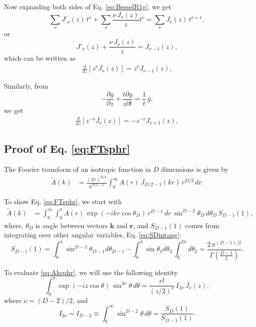 \documentclass[preprint]{revtex4-1}
\numberwithin{equation}{subsection}
\numberwithin{table}{section}
\newcommand{\vct}[1]{\mathbf{#1}}
\providecommand{\vr}{} %
\renewcommand{\vr}{\vct{r}}
\newcommand{\vk}{\vct{k}}
\begin{document}
Now expanding both sides of Eq. \eqref{eq:BesselR1g},
we get
\[
  \sum_\nu J'_\nu(z) \, t^\nu
+
  \sum_\nu \frac{ \nu \, J_\nu(z) } { z } t^\nu
=
  \sum_\nu J_{\nu}(z) \, t^{\nu+1},
\]
or
\[
  J'_\nu(z)
+
  \frac{ \nu \, J_\nu(z) } { z }
=
  J_{\nu - 1}(z),
\]
which can be written as
\begin{align}
  \frac{d}{dz} [z^{\nu} J_\nu(z)] = z^{\nu} J_{\nu-1}(z),
  \label{eq:BesselR1}
\end{align}

Similarly, from
\begin{equation}
-
  \frac { \partial g } { \partial z}
+
  \frac { t \partial g } { z \partial t}
=
  \frac{1}{t} \, g,
  \label{eq:BesselR2g}
\end{equation}
we get
\begin{align}
  \frac{d}{dz} [z^{-\nu} J_\nu(z)] = -z^{-\nu} J_{\nu+1}(z),
  \label{eq:BesselR2}
\end{align}





\subsection{Proof of Eq. \eqref{eq:FTsphr}}

The Fourier transform of an isotropic function in $D$ dimensions
is given by
\begin{align}
  \tilde A(k)
&=
\frac{(2\pi)^{D/2}}{k^{D/2-1}}
\int_0^\infty
A(r) \, J_{D/2-1}(kr) \,
r^{D/2} \, dr.
\tag{A1}
\label{eq:FTsphr}
\end{align}

To show Eq. \eqref{eq:FTsphr}, we start with
%
\begin{align}
  \tilde A(k)
&=
  \int_0^\infty
  \int_0^\pi
  A(r) \, \exp(-ikr \cos \theta_D) \,
    r^{D-1} \, dr \,
    \sin^{D-2} \theta_D \,
    d\theta_D \, S_{D-1}(1),
\label{eq:Aksphr}
\end{align}
%
where,
$\theta_D$ is angle between vectors $\vk$ and $\vr$,
and
$S_{D-1}(1)$ comes from integrating over other angular variables,
Eq. \eqref{eq:SDintang}:
\[
  S_{D-1}(1)
=
\int_0^\pi \sin^{D-3} \theta_{D-1} d\theta_{D-1} \,
\cdots \,
\int_0^\pi \sin \theta_3 d\theta_3 \,
\int_0^{2\pi} d\theta_2
=
\frac{2 \, \pi^{(D-1)/2} } { \Gamma\left( \frac{D-1} 2 \right) }.
\]
%

To evaluate \eqref{eq:Aksphr},
we will use the following identity
\begin{equation}
  \int_0^\pi
  \exp(-iz\cos\theta) \,
  \sin^{2\nu} \theta \,
  d \theta
=
  \frac{ \nu! }{ (z/2)^\nu } \,
  I_{2 \nu} \, J_\nu(z),
  \label{eq:intexpsin}
\end{equation}
%
where $\nu = (D - 2)/2$,
and
\begin{equation}
  I_{2\nu}
=
  I_{D-2}
\equiv
  \int_0^\infty \sin^{D-2} \theta \, d\theta
=
\frac{ S_{D}(1) }
  { S_{D-1}(1) }.
\end{equation}
\end{document}
